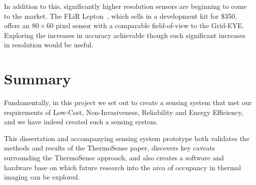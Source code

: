 \documentclass[../thesis/thesis.tex]{subfiles}
\begin{document}
In addition to this, significantly higher resolution sensors are beginning to come to the market. The FLiR Lepton~\cite{flir}, which sells in a development kit for \$350, offers an $80 \times 60$ pixel sensor with a comparable field-of-view to the Grid-EYE. Exploring the increases in accuracy achievable though such significant increases in resolution would be useful.

\section{Summary}
Fundamentally, in this project we set out to create a sensing system that met our requirements of Low-Cost, Non-Invasiveness, Reliability and Energy Efficiency, and we have indeed created such a sensing system. %

This dissertation and accompanying sensing system prototype both validates the methods and results of the ThermoSense paper, discovers key caveats surrounding the ThermoSense approach, and also creates a software and hardware base on which future research into the area of occupancy in thermal imaging can be explored.
 
\end{document}
